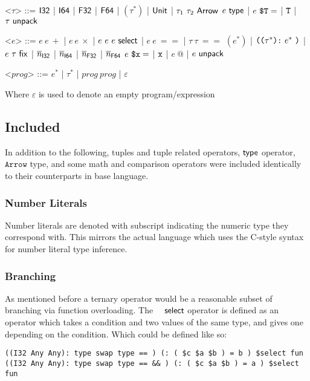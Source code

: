 \documentclass{article}
\begin{document}
\renewcommand{\grammarlabel}[2]{#1 \hfill#2}
\begin{grammar}
    <$\tau$> ::= $\mathsf{I32}$
    |    $\mathsf{I64}$
    |    $\mathsf{F32}$
    |    $\mathsf{F64}$
    |    $(\tau^*)$
    |    $\mathsf{Unit}$
    |    $\tau_1 ~ \tau_2 ~ \mathsf{Arrow}$
    \alt $e ~ \mathsf{type}$
    |    $e~ \texttt{\$T} =$
    |    $\texttt{T}$
    |    $\tau ~ \mathsf{unpack}$

    <$e$> ::= $e~ e~ +$
    |    $e~ e~ \times$
    |    $e ~ e ~ e ~ \mathsf{select} $
    |    $e~ e~ ==$
    |    $\tau~ \tau~ ==$
    \alt $(e^*)$
    |    $\texttt{((} \tau^* \texttt{):} ~ e^* ~ \texttt{)}$
    |    $e ~ \tau ~ \mathsf{fix}$
    |    $\overline{n}_{\mathsf{I32}}$
    |    $\overline{n}_{\mathsf{I64}}$
    |    $\overline{n}_{\mathsf{F32}}$
    |    $\overline{n}_{\mathsf{F64}}$
    \alt $e~ \texttt{\$x} =$
    |    $\texttt{x}$
    |    $e~ \textbf{@} $
    |    $e ~ \mathsf{unpack}$
    
    <$prog$> ::= $e^*$ | $\tau^*$ | $prog~ prog$ | $\varepsilon$
\end{grammar}
Where $\varepsilon$ is used to denote an empty program/expression

\subsection{Included}
In addition to the following, tuples and tuple related operators,$~ \mathsf{type}$ operator, $\texttt{Arrow}$ type, and some math and comparison operators were included identically to their counterparts in base language.

\subsubsection{Number Literals}
Number literals are denoted with subscript indicating the numeric type they correspond with.
This mirrors the actual language which uses the C-style syntax for number literal type inference.

\subsubsection{Branching}
As mentioned before a ternary operator would be a reasonable subset of branching via function overloading. The $~  ~  ~ \mathsf{select}$ operator is defined as an operator which takes a condition and two values of the same type, and gives one depending on the condition. Which could be defined like so:

\begin{verbatim}
((I32 Any Any): type swap type == ) (: ( $c $a $b ) = b ) $select fun
((I32 Any Any): type swap type == && ) (: ( $c $a $b ) = a ) $select fun
\end{verbatim}
\end{document}
